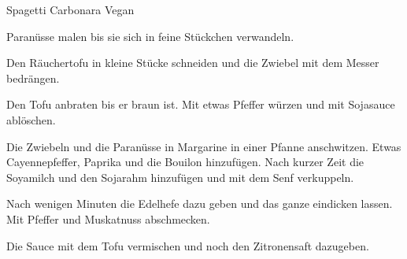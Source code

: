 
\begin{recipe}[]{Spagetti Carbonara Vegan}{}{}



\step%
Paran\"usse malen bis sie sich in feine St\"uckchen verwandeln.

\step%
Den R\"auchertofu in kleine St\"ucke schneiden und die Zwiebel mit dem Messer
bedr\"angen.


\step%
Den Tofu anbraten bis er braun ist. Mit etwas Pfeffer w\"urzen und mit
Sojasauce abl\"oschen.

\step%
Die Zwiebeln und die Paran\"usse in Margarine in einer Pfanne anschwitzen.
Etwas Cayennepfeffer, Paprika und die Bouilon hinzuf\"ugen. Nach kurzer Zeit
die Soyamilch und den Sojarahm hinzuf\"ugen und mit dem Senf verkuppeln.

\step%
Nach wenigen Minuten die Edelhefe dazu geben und das ganze eindicken lassen.
Mit Pfeffer und Muskatnuss abschmecken.

\step%
Die Sauce mit dem Tofu vermischen und noch den Zitronensaft dazugeben.


\end{recipe}
